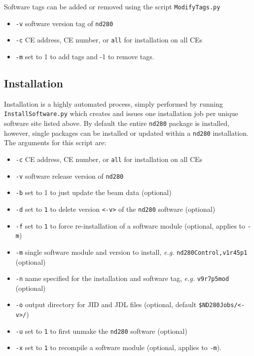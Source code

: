 \documentclass[11pt]{article}
\begin{document}
Software tags can be added or removed using the script \verb+ModifyTags.py+
\begin{itemize}
\item \verb+-v+ software version tag of \verb+nd280+
\item \verb+-c+ CE address, CE number, or \verb+all+ for installation on all CEs
\item \verb+-m+ set to 1 to add tags and -1 to remove tags.
\end{itemize}

\subsection{Installation}
Installation is a highly automated process, simply performed by
running \verb+InstallSoftware.py+ which creates and issues one
installation job per unique software site listed above. By default the
entire \verb+nd280+ package is installed, however, single packages can
be installed or updated within a \verb+nd280+ installation. The
arguments for this script are:

\begin{itemize}
\item \verb+-c+ CE address, CE number, or \verb+all+ for installation on all CEs
\item \verb+-v+ software release version of \verb+nd280+
\item \verb+-b+ set to 1 to just update the beam data (optional)
\item \verb+-d+ set to \verb+1+ to delete version \verb+<-v>+ of the \verb+nd280+ software (optional)
\item \verb+-f+ set to \verb+1+ to force re-installation of a software module (optional, applies to \verb+-m+)
\item \verb+-m+ single software module and version to install, \textit{e.g.}
 \verb+nd280Control,v1r45p1+ (optional)
\item \verb+-n+ name specified for the installation and software tag, \textit{e.g.} \verb+v9r7p5mod+ (optional)
\item \verb+-o+ output directory for JID and JDL files (optional, default \verb+$ND280Jobs/<-v>/+)
\item \verb+-u+ set to \verb+1+ to first unmake the \verb+nd280+ software (optional)
\item \verb+-x+ set to \verb+1+ to recompile a software module (optional, applies to \verb+-m+).
\end{itemize}
\end{document}
